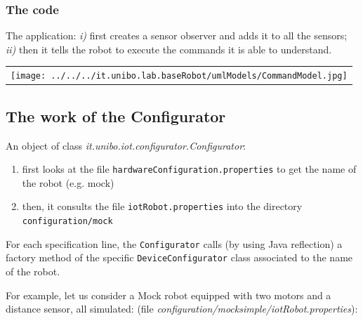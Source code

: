 \subsubsection{The code}

The application: \textit{i)} first creates a sensor observer and adds it to all the sensors; \textit{ii)} then it tells the robot to execute the commands it is able to understand.



\begin{center}
\begin{tabular}{ c }
     \texttt{[image: ../../../it.unibo.lab.baseRobot/umlModels/CommandModel.jpg]}\\
\end{tabular} 
\end{center}

\subsection{The work of the Configurator}

An object of class \textit{it.unibo.iot.configurator.Configurator}:
\begin{enumerate}
\item first looks at the file \texttt{hardwareConfiguration.properties} to get the name of the robot (e.g. mock)
\item then, it consults the file \texttt{iotRobot.properties} into the directory \texttt{configuration/mock}
\end{enumerate}
 
For each specification line, the \texttt{Configurator} calls (by using Java reflection) a factory method of the specific \texttt{DeviceConfigurator} class associated to the name of the robot.

For example, let us consider a Mock robot equipped with two motors and a distance sensor, all simulated:
(file \textit{configuration/mocksimple/iotRobot.properties}):


